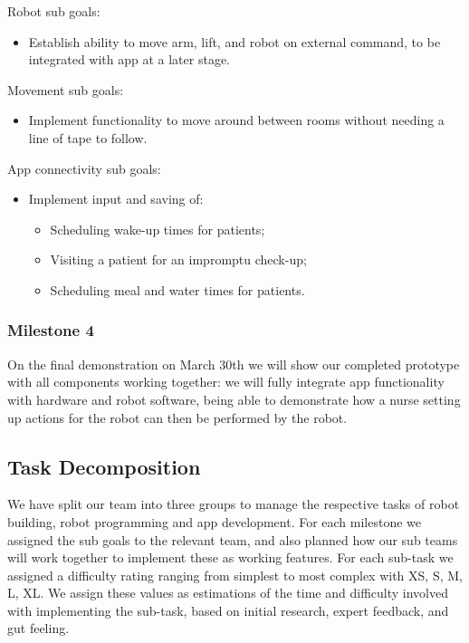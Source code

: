 \documentclass{article}
\begin{document}
Robot sub goals:
\begin{itemize}
\item Establish ability to move arm, lift, and robot on external command, to be integrated with app at a later stage. 
\end{itemize}

Movement sub goals:
\begin{itemize}
\item Implement functionality to move around between rooms without needing a line of tape to follow.
\end{itemize}

App connectivity sub goals:
\begin{itemize}
\item Implement input and saving of:
  \begin{itemize}
  \item Scheduling wake-up times for patients;
  \item Visiting a patient for an impromptu check-up;
  \item Scheduling meal and water times for patients. 
  \end{itemize}
\end{itemize}

\subsubsection{Milestone 4}

On the final demonstration on March 30th we will show our completed prototype with all components working together: we will fully integrate app functionality with hardware and robot software, being able to demonstrate how a nurse setting up actions for the robot can then be performed by the robot. 

\subsection{Task Decomposition}

We have split our team into three groups to manage the respective tasks of robot building, robot programming and app development. For each milestone we assigned the sub goals to the relevant team, and also planned how our sub teams will work together to implement these as working features.
For each sub-task we assigned a difficulty rating ranging from simplest to most complex with XS, S, M, L, XL. We assign these values as estimations of the time and difficulty involved with implementing the sub-task, based on initial research, expert feedback, and gut feeling. 
\end{document}
